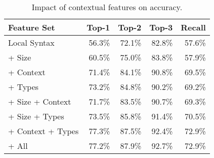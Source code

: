 \begin{table}[ht]
  \begin{minipage}{0.49\linewidth}
  \centering
  \hiddenFH
  \begin{tabular}{lrrrr}
    \toprule
    Feature Set                 & Top-1  & Top-2  & Top-3  & Recall \\
    \midrule
    Local Syntax                & 56.3\% & 72.1\% & 82.8\% & 57.6\% \\
    \midrule
    + Size                      & 60.5\% & 75.0\% & 83.8\% & 57.9\% \\
    + Context                   & 71.4\% & 84.1\% & 90.8\% & 69.5\% \\
    + Types                     & 73.2\% & 84.8\% & 90.2\% & 69.2\% \\
    \midrule
    + Size + Context            & 71.7\% & 83.5\% & 90.7\% & 69.3\% \\
    + Size + Types              & 73.5\% & 85.8\% & 91.4\% & 70.5\% \\
    + Context + Types           & 77.3\% & 87.5\% & 92.4\% & 72.9\% \\
    \midrule
    + All                       & 77.2\% & 87.9\% & 92.7\% & 72.9\% \\
    \bottomrule
  \end{tabular}
  \end{minipage}
  \caption{
    Impact of contextual features on accuracy.
  }\label{tab:type-error-slice}
\end{table}
